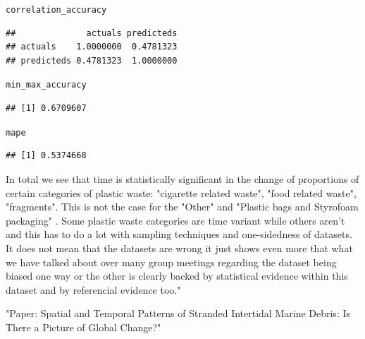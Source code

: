 \documentclass[10pt]{article}\usepackage[]{graphicx}\usepackage[]{color}
\makeatletter
\newcommand{\hlstd}[1]{\textcolor[rgb]{0.345,0.345,0.345}{#1}}%
\newenvironment{kframe}{%
 \def\at@end@of@kframe{}%
 \ifinner\ifhmode%
  \def\at@end@of@kframe{\end{minipage}}%
  \begin{minipage}{\columnwidth}%
 \fi\fi%
 \def\FrameCommand##1{\hskip\@totalleftmargin \hskip-\fboxsep
 \colorbox{shadecolor}{##1}\hskip-\fboxsep
     \hskip-\linewidth \hskip-\@totalleftmargin \hskip\columnwidth}%
 \MakeFramed {\advance\hsize-\width
   \@totalleftmargin\z@ \linewidth\hsize
   \@setminipage}}%
 {\par\unskip\endMakeFramed%
 \at@end@of@kframe}
\newenvironment{knitrout}{}{} %
\makeatother
\begin{document}
\begin{knitrout}
\begin{kframe}
\begin{alltt}
\hlstd{correlation_accuracy}
\end{alltt}
\begin{verbatim}
##              actuals predicteds
## actuals    1.0000000  0.4781323
## predicteds 0.4781323  1.0000000
\end{verbatim}
\begin{alltt}
\hlstd{min_max_accuracy}
\end{alltt}
\begin{verbatim}
## [1] 0.6709607
\end{verbatim}
\begin{alltt}
\hlstd{mape}
\end{alltt}
\begin{verbatim}
## [1] 0.5374668
\end{verbatim}
\end{kframe}
\end{knitrout}

In total we see that time is statistically significant in the change of proportions of certain categories
of plastic waste: "cigarette related waste", "food related waste", "fragments". This is not the case for the "Other" and "Plastic bags and Styrofoam packaging" .
Some plastic waste categories are time variant while others aren't and this has to do a  lot with sampling techniques and one-sidedness of datasets. It does not mean that the datasets are wrong it just shows even more that what we have talked about over many group meetings regarding the dataset being biased one way or the other is clearly backed by statistical evidence within this dataset and by referencial evidence too."

"Paper: Spatial and Temporal Patterns of Stranded Intertidal Marine Debris:
Is There a Picture of Global Change?"
\end{document}
